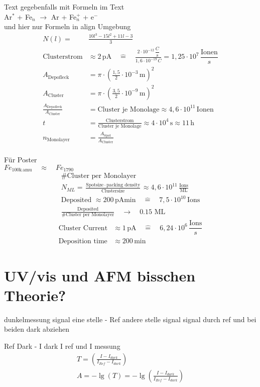 Text gegebenfalls mit Formeln im Text \\
Ar$^*$ + Fe$_n$ $\rightarrow $ Ar + Fe$^+_{n}$ + e$^-$ \\
und hier nur Formeln in align Umgebung\\
\begin{align}
  N(l)=&\frac{10l^3 -15l^2 + 11l -3}{3} \\
  \text{Clusterstrom}&\approx 2\,\text{pA} \quad \widehat{=} \quad \frac{2\cdot10^{-12}\,\dfrac{C}{s}}{1,6\cdot10^{-19}\,C} = 1,25\cdot10^7 \,\dfrac{\text{Ionen}}{s} \\
  A_{\text{Depofleck}}&=\pi\cdot(\frac{1,5}{2}\cdot10^{-3}\,\text{m})^2 \\
  A_{\text{Cluster}}&=\pi\cdot(\frac{3,5}{2}\cdot10^{-9}\,\text{m})^2 \\
  \frac{A_{\text{Depofleck}}}{A_{\text{Cluster}}}&= \text{Cluster je Monolage}\approx 4,6\cdot10^{11} \,\text{Ionen}\\
  t&=\frac{\text{Clusterstrom}}{\text{Cluster je Monolage}}\approx 4\cdot10^4\,\text{s} \approx 11\,\text{h} \\
  n_{\text{Monolayer}}&=\frac{A_{\text{Spot}}}{A_{\text{Cluster}}}
\end{align}
\blindtext \\
Für Poster \\
$Fe_{100\text{k}\,\text{amu}} \quad\approx\quad Fe_{1790} $
\begin{align*}
 \text{\#Cluster per Monolayer}\\
 N_{ML}=\frac{\text{Spotsize$\,\cdot\,$packing density}}{\text{Clustersize}} \approx  4,6\cdot10^{11}\,\frac{\text{Ions}}{\text{ML}} \\
 \text{Deposited $\approx 200\,$pAmin}\quad \widehat{=} \quad  7,5\cdot10^{10} \,\text{Ions} \\
 \frac{\text{Deposited}}{\text{\#Cluster per Monolayer}}\quad \rightarrow \quad 0.15\,\,\text{ML}
\end{align*}
\begin{align}
 \text{Cluster Current}&\approx 1\,\text{pA} \quad \widehat{=} \quad 6,24\cdot10^6 \,\dfrac{\text{Ions}}{s} \\
 \text{Deposition time}&\approx 200\,\text{min} 
\end{align}

\section{UV/vis und AFM bisschen Theorie?}
dunkelmessung
signal eine stelle - Ref
andere stelle signal
signal durch ref und bei beiden dark abziehen


Ref Dark - I dark I ref und I messung
\begin{align*}
    T=\left(\frac{I-I_{dark}}{I_{Ref}-I_{dark}}\right)\\
    A=- \lg\left(T\right) = -\lg\left(\frac{I-I_{dark}}{I_{Ref}-I_{dark}}\right)
\end{align*}

